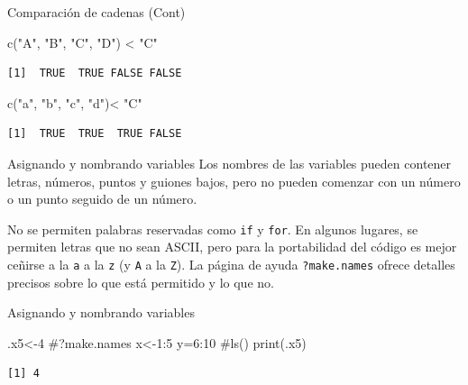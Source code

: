 \documentclass[
  ignorenonframetext,
  aspectratio=169,
  spanish,
]{beamer}
\newenvironment{Shaded}{\begin{snugshade}}{\end{snugshade}}
\newcommand{\CommentTok}[1]{\textcolor[rgb]{0.37,0.37,0.37}{#1}}
\newcommand{\DecValTok}[1]{\textcolor[rgb]{0.68,0.00,0.00}{#1}}
\newcommand{\FunctionTok}[1]{\textcolor[rgb]{0.28,0.35,0.67}{#1}}
\newcommand{\NormalTok}[1]{\textcolor[rgb]{0.00,0.23,0.31}{#1}}
\newcommand{\OtherTok}[1]{\textcolor[rgb]{0.00,0.23,0.31}{#1}}
\newcommand{\SpecialCharTok}[1]{\textcolor[rgb]{0.37,0.37,0.37}{#1}}
\newcommand{\StringTok}[1]{\textcolor[rgb]{0.13,0.47,0.30}{#1}}
\begin{document}
\begin{frame}[fragile]{Comparación de cadenas (Cont)}
\label{comparaciuxf3n-de-cadenas-cont}
\begin{Shaded}
\begin{Highlighting}[]
\FunctionTok{c}\NormalTok{(}\StringTok{"A"}\NormalTok{, }\StringTok{"B"}\NormalTok{, }\StringTok{"C"}\NormalTok{, }\StringTok{"D"}\NormalTok{) }\SpecialCharTok{\textless{}} \StringTok{"C"}
\end{Highlighting}
\end{Shaded}

\begin{verbatim}
[1]  TRUE  TRUE FALSE FALSE
\end{verbatim}

\begin{Shaded}
\begin{Highlighting}[]
\FunctionTok{c}\NormalTok{(}\StringTok{"a"}\NormalTok{, }\StringTok{"b"}\NormalTok{, }\StringTok{"c"}\NormalTok{, }\StringTok{"d"}\NormalTok{)}\SpecialCharTok{\textless{}} \StringTok{"C"}
\end{Highlighting}
\end{Shaded}

\begin{verbatim}
[1]  TRUE  TRUE  TRUE FALSE
\end{verbatim}
\end{frame}

\begin{frame}[fragile]{Asignando y nombrando variables}
\label{asignando-y-nombrando-variables}
Los nombres de las variables pueden contener letras, números, puntos y
guiones bajos, pero no pueden comenzar con un número o un punto seguido
de un número.

No se permiten palabras reservadas como \texttt{if} y \texttt{for}. En
algunos lugares, se permiten letras que no sean ASCII, pero para la
portabilidad del código es mejor ceñirse a la \texttt{a} a la \texttt{z}
(y \texttt{A} a la \texttt{Z}). La página de ayuda \texttt{?make.names}
ofrece detalles precisos sobre lo que está permitido y lo que no.
\end{frame}

\begin{frame}[fragile]{Asignando y nombrando variables}
\label{asignando-y-nombrando-variables-1}
\begin{Shaded}
\begin{Highlighting}[]
\NormalTok{.x5}\OtherTok{\textless{}{-}}\DecValTok{4}
\CommentTok{\#?make.names}
\NormalTok{x}\OtherTok{\textless{}{-}}\DecValTok{1}\SpecialCharTok{:}\DecValTok{5}
\NormalTok{y}\OtherTok{=}\DecValTok{6}\SpecialCharTok{:}\DecValTok{10}
\CommentTok{\#ls()}
\FunctionTok{print}\NormalTok{(.x5)}
\end{Highlighting}
\end{Shaded}

\begin{verbatim}
[1] 4
\end{verbatim}
\end{frame}
\end{document}
